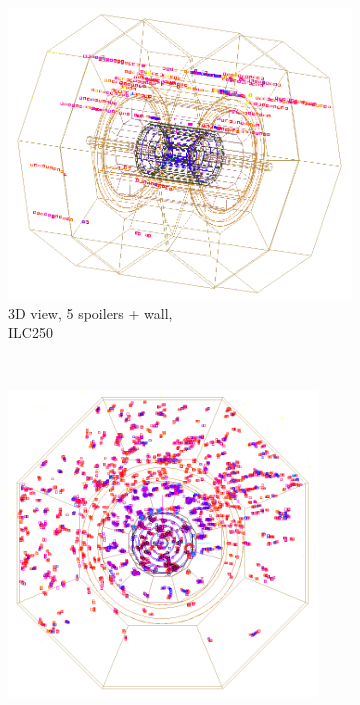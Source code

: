  \begin{figure}[!h]
 \captionsetup[subfigure]{justification=centering}
 \centering
  \begin{subfigure}[b]{0.4\textwidth}
   \centering
   \includegraphics[width=\textwidth]{Figures/BDS_muons/Event_display_ILC250_p_spoilers_wall_inverted.png}
   \caption{3D view, 5 spoilers + wall,\\ILC250}
   \end{subfigure}\\
   \begin{subfigure}[b]{0.4\textwidth}
   \centering
    \includegraphics[width=0.9\textwidth]{Figures/BDS_muons/muons_positron_5spoilers_wall_515_xyview_croped_inverted.png}

\end{subfigure}
\end{figure}
